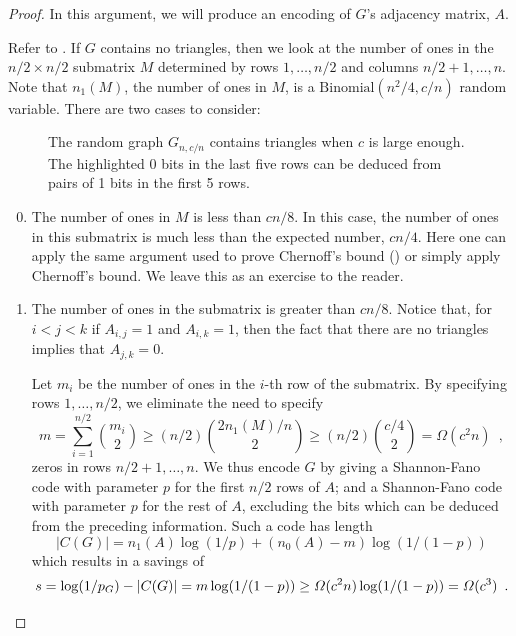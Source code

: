 \documentclass{patmorin}
\begin{document}
\begin{proof}
  In this argument, we will produce an encoding of $G$'s adjacency
  matrix, $A$.

  Refer to .  If $G$ contains no triangles, then we
  look at the number of ones in the $n/2\times n/2$ submatrix $M$
  determined by rows $1,\ldots,n/2$ and columns $n/2+1,\ldots,n$. Note
  that $n_1(M)$, the number of ones in $M$, is a
  $\mathrm{Binomial}(n^2/4, c/n)$ random variable.  There are two
  cases to consider:
  
  \begin{figure}
    \caption{The random graph $G_{n,c/n}$ contains triangles when $c$
      is large enough.  The highlighted 0 bits in the last five rows
      can be deduced from pairs of 1 bits in the first 5 rows.}
  \end{figure}

  \begin{enumerate}\setcounter{enumi}{-1}
  \item The number of ones in $M$ is less than $cn/8$.  In this case,
    the number of ones in this submatrix is much less than the
    expected number, $cn/4$.  Here one can apply the same argument
    used to prove Chernoff's bound () or simply apply
    Chernoff's bound. We leave this as an exercise to the reader.

  \item The number of ones in the submatrix is greater than $cn/8$.
    Notice that, for $i<j<k$ if $A_{i,j}=1$ and $A_{i,k}=1$, then the
    fact that there are no triangles implies that $A_{j,k}=0$.

    Let $m_i$ be the number of ones in the $i$-th row of the
    submatrix.  By specifying rows $1,\ldots,n/2$, we eliminate the
    need to specify
    \[
      m = \sum_{i=1}^{n/2}\binom{m_i}{2} \ge (n/2) \binom{2
        n_1(M)/n}{2} \ge (n/2)\binom{c/4}{2} = \varOmega(c^2n) \enspace ,
    \]
    zeros in rows $n/2+1,\ldots,n$. We thus encode $G$ by giving a
    Shannon-Fano code with parameter $p$ for the first $n/2$ rows of
    $A$; and a Shannon-Fano code with parameter $p$ for the rest of
    $A$, excluding the bits which can be deduced from the preceding
    information. Such a code has length
    \[
      |C(G)| = n_1(A) \log(1/p) + (n_0(A)-m)\log(1/(1-p))
    \]
    which results in a savings of
    \[
      s = \log(1/p_G) - |C(G)| = m\log(1/(1-p)) \ge
      \varOmega(c^2n)\log(1/(1-p)) = \varOmega(c^3) \enspace . \qedhere
    \]
  \end{enumerate}
\end{proof}
\end{document}
